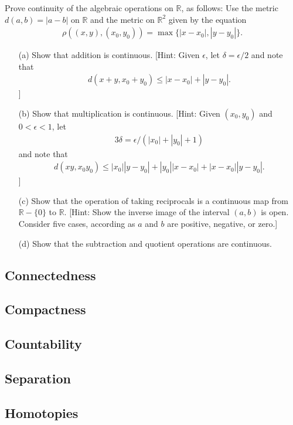   \begin{exercise}[Munkres 21.12]
    Prove continuity of the algebraic operations on $\mathbb{R}$, as follows: Use the metric $d(a, b) = |a - b|$ on $\mathbb{R}$ and the metric on $\mathbb{R}^2$ given by the equation
    \begin{align*}
      \rho((x, y), (x_0, y_0)) = \max\{|x - x_0|, |y - y_0|\}.
    \end{align*}
    \begin{enumerate} 
      \item[(a)] Show that addition is continuous. [Hint: Given $\epsilon$, let $\delta = \epsilon/2$ and note that 
      \begin{align*}
        d(x + y, x_0 + y_0) \leq |x - x_0| + |y - y_0|.
      \end{align*}
      ]
      \item[(b)] Show that multiplication is continuous. [Hint: Given $(x_0, y_0)$ and $0 < \epsilon < 1$, let 
      \begin{align*}
        3\delta = \epsilon/(|x_0| + |y_0| + 1)
      \end{align*}
      and note that
      \begin{align*}
        d(xy, x_0y_0) \leq |x_0||y - y_0| + |y_0||x - x_0| + |x - x_0||y - y_0|.
      \end{align*}
      ]
      \item[(c)] Show that the operation of taking reciprocals is a continuous map from $\mathbb{R} - \{0\}$ to $\mathbb{R}$. [Hint: Show the inverse image of the interval $(a, b)$ is open. Consider five cases, according as $a$ and $b$ are positive, negative, or zero.]
      \item[(d)] Show that the subtraction and quotient operations are continuous.
    \end{enumerate}
  \end{exercise}

\subsection{Connectedness}

\subsection{Compactness}

\subsection{Countability}

\subsection{Separation} 

\subsection{Homotopies}
